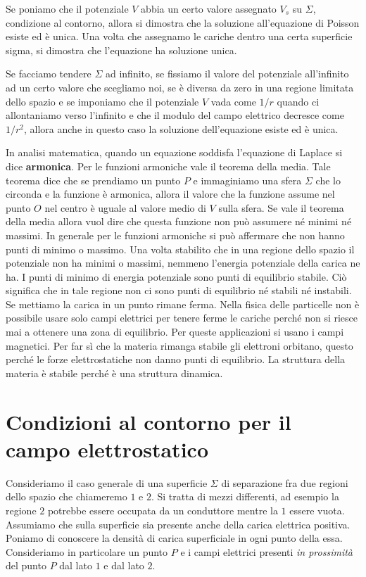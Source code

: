 Se poniamo che il potenziale $V$ abbia un certo valore assegnato $V_s $ su $\Sigma$, condizione al contorno, allora si dimostra che la soluzione all'equazione di Poisson esiste ed è unica. Una volta che assegnamo le cariche dentro una certa superficie sigma, si dimostra che l'equazione ha soluzione unica.

Se facciamo tendere $\Sigma$ ad infinito, se fissiamo il valore del potenziale all'infinito ad un certo valore che scegliamo noi, se è diversa da zero in una regione limitata dello spazio e se imponiamo che il potenziale $V$ vada come $1/r$ quando ci allontaniamo verso l'infinito e che il modulo del campo elettrico decresce come $1/r^2$, allora anche in questo caso la soluzione dell'equazione esiste ed è unica.

In analisi matematica, quando un equazione soddisfa l'equazione di Laplace si dice \textbf{armonica}. Per le funzioni armoniche vale il teorema della media. Tale teorema dice che se prendiamo un punto $P$ e immaginiamo una sfera $ \Sigma  $ che lo circonda e la funzione è armonica, allora il valore che la funzione assume nel punto $O$ nel centro è uguale al valore medio di $V$ sulla sfera.
Se vale il teorema della media allora vuol dire che questa funzione non può assumere né minimi né massimi. In generale per le funzioni armoniche si può affermare che non hanno punti di minimo o massimo. Una volta stabilito che in una regione dello spazio il potenziale non ha minimi o massimi, nemmeno l'energia potenziale della carica ne ha. I punti di minimo di energia potenziale sono punti di equilibrio stabile. Ciò significa che in tale regione non ci sono punti di equilibrio né stabili né instabili. Se mettiamo la carica in un punto rimane ferma. Nella fisica delle particelle non è possibile usare solo campi elettrici per tenere ferme le cariche perché non si riesce mai a ottenere una zona di equilibrio. Per queste applicazioni si usano i campi magnetici. Per far sì che la materia rimanga stabile gli elettroni orbitano, questo perché le forze elettrostatiche non danno punti di equilibrio. La struttura della materia è stabile perché è una struttura dinamica.

\section{Condizioni al contorno per il campo elettrostatico}

Consideriamo il caso generale di una superficie $\Sigma$ di separazione fra due regioni dello spazio che chiameremo $1$ e $2$. Si tratta di mezzi differenti, ad esempio la regione $2$ potrebbe essere occupata da un conduttore mentre la $1$ essere vuota. Assumiamo che sulla superficie sia presente anche della carica elettrica positiva. Poniamo di conoscere la densità di carica superficiale in ogni punto della essa. Consideriamo in particolare un punto $P$ e i campi elettrici presenti \emph{in prossimità} del punto $P$ dal lato $1$ e dal lato $2$.


